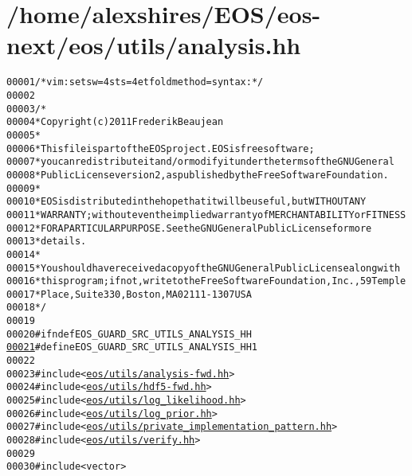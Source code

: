 \hypertarget{analysis_8hh_source}{
\section{/home/alexshires/EOS/eos-\/next/eos/utils/analysis.hh}
}


\begin{footnotesize}\begin{alltt}
00001 \textcolor{comment}{/* vim: set sw=4 sts=4 et foldmethod=syntax : */}
00002 
00003 \textcolor{comment}{/*}
00004 \textcolor{comment}{ * Copyright (c) 2011 Frederik Beaujean}
00005 \textcolor{comment}{ *}
00006 \textcolor{comment}{ * This file is part of the EOS project. EOS is free software;}
00007 \textcolor{comment}{ * you can redistribute it and/or modify it under the terms of the GNU General}
00008 \textcolor{comment}{ * Public License version 2, as published by the Free Software Foundation.}
00009 \textcolor{comment}{ *}
00010 \textcolor{comment}{ * EOS is distributed in the hope that it will be useful, but WITHOUT ANY}
00011 \textcolor{comment}{ * WARRANTY; without even the implied warranty of MERCHANTABILITY or FITNESS}
00012 \textcolor{comment}{ * FOR A PARTICULAR PURPOSE.  See the GNU General Public License for more}
00013 \textcolor{comment}{ * details.}
00014 \textcolor{comment}{ *}
00015 \textcolor{comment}{ * You should have received a copy of the GNU General Public License along with}
00016 \textcolor{comment}{ * this program; if not, write to the Free Software Foundation, Inc., 59 Temple}
00017 \textcolor{comment}{ * Place, Suite 330, Boston, MA  02111-1307  USA}
00018 \textcolor{comment}{ */}
00019 
00020 \textcolor{preprocessor}{#ifndef EOS\_GUARD\_SRC\_UTILS\_ANALYSIS\_HH}
\hypertarget{analysis_8hh_source_l00021}{}\hyperlink{analysis_8hh_afbc3a34a049a4477d7a33b9e9e491f19}{00021} \textcolor{preprocessor}{}\textcolor{preprocessor}{#define EOS\_GUARD\_SRC\_UTILS\_ANALYSIS\_HH 1}
00022 \textcolor{preprocessor}{}
00023 \textcolor{preprocessor}{#include <\hyperlink{analysis-fwd_8hh}{eos/utils/analysis-fwd.hh}>}
00024 \textcolor{preprocessor}{#include <\hyperlink{hdf5-fwd_8hh}{eos/utils/hdf5-fwd.hh}>}
00025 \textcolor{preprocessor}{#include <\hyperlink{log__likelihood_8hh}{eos/utils/log_likelihood.hh}>}
00026 \textcolor{preprocessor}{#include <\hyperlink{log__prior_8hh}{eos/utils/log_prior.hh}>}
00027 \textcolor{preprocessor}{#include <\hyperlink{private__implementation__pattern_8hh}{eos/utils/private_implementation_pattern.hh}>}
00028 \textcolor{preprocessor}{#include <\hyperlink{verify_8hh}{eos/utils/verify.hh}>}
00029 
00030 \textcolor{preprocessor}{#include <vector>}

\end{alltt}
\end{footnotesize}
